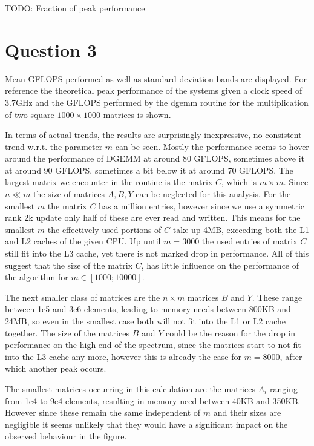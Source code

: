 \documentclass{scrartcl}
\begin{document}
TODO: Fraction of peak performance

\section{Question 3}


Mean GFLOPS performed as well as standard deviation bands are displayed. 
For reference the theoretical peak performance of the systems given a clock speed of $3.7$GHz and the GFLOPS performed by the dgemm routine for the multiplication of two square $1000 \times 1000$ matrices is shown.

In terms of actual trends, the results are surprisingly inexpressive, no consistent trend w.r.t. the parameter $m$ can be seen.
Mostly the performance seems to hover around the performance of DGEMM at around 80 GFLOPS, sometimes above it at around 90 GFLOPS, sometimes a bit below it at around 70 GFLOPS.
The largest matrix we encounter in the routine is the matrix $C$, which is $m \times m$.
Since $n \ll m$ the size of matrices $A,B,Y$ can be neglected for this analysis.
For the smallest $m$ the matrix $C$ has a million entries, however since we use a symmetric rank 2k update only half of these are ever read and written.
This means for the smallest $m$ the effectively used portions of $C$ take up 4MB, exceeding both the L1 and L2 caches of the given CPU.
Up until $m=3000$ the used entries of matrix $C$ still fit into the L3 cache, yet there is not marked drop in performance.
All of this suggest that the size of the matrix $C$, has little influence on the performance of the algorithm for $m \in [1000;10000]$.

The next smaller class of matrices are the $n \times m$ matrices $B$ and $Y$.
These range between 1e5 and 3e6 elements, leading to memory needs between 800KB and 24MB, so even in the smallest case both will not fit into the L1 or L2 cache together.
The size of the matrices $B$ and $Y$ could be the reason for the drop in performance on the high end of the spectrum, since the matrices start to not fit into the L3 cache any more, however this is already the case for $m=8000$, after which another peak occurs.

The smallest matrices occurring in this calculation are the matrices $A_i$ ranging from 1e4 to 9e4 elements, resulting in memory need between 40KB and 350KB.
However since these remain the same independent of $m$ and their sizes are negligible it seems unlikely that they would have a significant impact on the observed behaviour in the figure.
\end{document}
